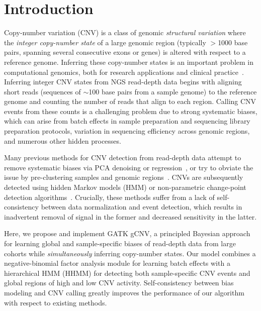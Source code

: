 \documentclass[sigplan]{acmart}\settopmatter{printfolios=true,printccs=false,printacmref=false}
\begin{document}
\renewcommand{\thefootnote}{\fnsymbol{footnote}}

\section{Introduction}
Copy-number variation (CNV) is a class of genomic {\em structural variation} where the {\em integer copy-number state} of a large genomic region (typically $>$1000 base pairs, spanning several consecutive exons or genes) is altered with respect to a reference genome.  Inferring these copy-number states is an important problem in computational genomics, both for research applications and clinical practice~\cite{zhang2009copy}. Inferring integer CNV states from NGS read-depth data begins with aligning short reads (sequences of $\sim$100 base pairs from a sample genome) to the reference genome and counting the number of reads that align to each region.  Calling CNV events from these counts is a challenging problem due to strong systematic biases, which can arise from batch effects in sample preparation and sequencing library preparation protocols, variation in sequencing efficiency across genomic regions, and numerous other hidden processes.

Many previous methods for CNV detection from read-depth data attempt to remove systematic biases via PCA denoising \cite{fromer_discovery_2012} or regression~\cite{jiang_codex:_2015, klambauer_cn.mops:_2012}, or try to obviate the issue by pre-clustering samples and genomic regions~\cite{handsaker_large_2015, packer_clamms:_2016}.  CNVs are subsequently detected using hidden Markov models (HMM) or non-parametric change-point detection algorithms~\cite{olshen_circular_2004}. Crucially, these methods suffer from a lack of self-consistency between data normalization and event detection, which results in inadvertent removal of signal in the former and decreased sensitivity in the latter.

Here, we propose and implement GATK gCNV, a principled Bayesian approach for learning global and sample-specific biases of read-depth data from large cohorts while {\em simultaneously} inferring copy-number states. Our model combines a negative-binomial factor analysis module for learning batch effects with a hierarchical HMM (HHMM) for detecting both sample-specific CNV events and global regions of high and low CNV activity.  Self-consistency between bias modeling and CNV calling greatly improves the performance of our algorithm with respect to existing methods.
\end{document}
